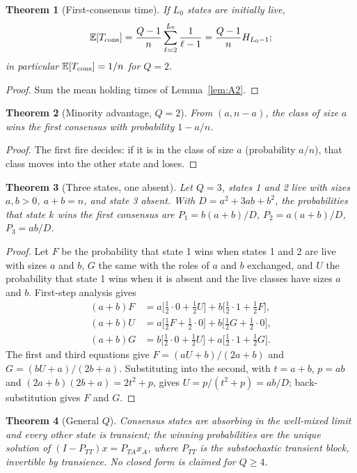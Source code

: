 \documentclass[aps,pre,onecolumn,superscriptaddress,amsmath,amssymb,longbibliography]{revtex4-2}
\newtheorem{theorem}{Theorem}[section]
\theoremstyle{definition}
\theoremstyle{remark}
\newcommand{\E}{\mathbb{E}}
\begin{document}
\begin{theorem}[First-consensus time]
\label{thm:A3}
If $L_0$ states are initially live,
\[
\E[T_{\rm cons}]=\frac{Q-1}{n}\sum_{\ell=2}^{L_0}\frac{1}{\ell-1}=\frac{Q-1}{n}H_{L_0-1};
\]
in particular $\E[T_{\rm cons}]=1/n$ for $Q=2$.
\end{theorem}
\begin{proof}
Sum the mean holding times of Lemma~\ref{lem:A2}.
\end{proof}

\begin{theorem}[Minority advantage, $Q=2$]
\label{thm:A4}
From $(a,n-a)$, the class of size $a$ wins the first consensus with
probability $1-a/n$.
\end{theorem}
\begin{proof}
The first fire decides: if it is in the class of size $a$ (probability
$a/n$), that class moves into the other state and loses.
\end{proof}

\begin{theorem}[Three states, one absent]
\label{thm:A5}
Let $Q=3$, states 1 and 2 live with sizes $a,b>0$, $a+b=n$, and state 3
absent. With $D=a^2+3ab+b^2$, the probabilities that state $k$ wins the
first consensus are $P_1=b(a+b)/D$, $P_2=a(a+b)/D$, $P_3=ab/D$.
\end{theorem}
\begin{proof}
Let $F$ be the probability that state 1 wins when states 1 and 2 are
live with sizes $a$ and $b$, $G$ the same with the roles of $a$ and $b$
exchanged, and $U$ the probability that state 1 wins when it is absent
and the live classes have sizes $a$ and $b$. First-step analysis gives
\begin{align*}
(a+b)F&=a\big[\tfrac12\cdot0+\tfrac12U\big]+b\big[\tfrac12\cdot1+\tfrac12F\big],\\
(a+b)U&=a\big[\tfrac12F+\tfrac12\cdot0\big]+b\big[\tfrac12G+\tfrac12\cdot0\big],\\
(a+b)G&=b\big[\tfrac12\cdot0+\tfrac12U\big]+a\big[\tfrac12\cdot1+\tfrac12G\big].
\end{align*}
The first and third equations give $F=(aU+b)/(2a+b)$ and
$G=(bU+a)/(2b+a)$. Substituting into the second, with $t=a+b$, $p=ab$ and
$(2a+b)(2b+a)=2t^2+p$, gives $U=p/(t^2+p)=ab/D$; back-substitution gives
$F$ and $G$.
\end{proof}

\begin{theorem}[General $Q$]
\label{thm:A6}
Consensus states are absorbing in the well-mixed limit and every other
state is transient; the winning probabilities are the unique solution of
$(I-P_{TT})x=P_{TA}x_A$, where $P_{TT}$ is the substochastic transient
block, invertible by transience. No closed form is claimed for $Q\ge4$.
\end{theorem}
\end{document}

